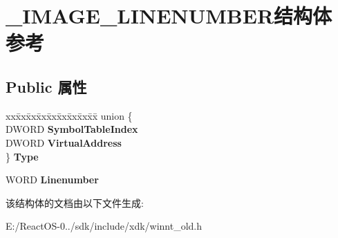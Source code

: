 \hypertarget{struct___i_m_a_g_e___l_i_n_e_n_u_m_b_e_r}{}\section{\+\_\+\+I\+M\+A\+G\+E\+\_\+\+L\+I\+N\+E\+N\+U\+M\+B\+E\+R结构体 参考}
\label{struct___i_m_a_g_e___l_i_n_e_n_u_m_b_e_r}
\subsection*{Public 属性}
\begin{DoxyCompactItemize}
\item 
\mbox{\label{struct___i_m_a_g_e___l_i_n_e_n_u_m_b_e_r_afc6fd323149b3a872062c8051fcd2bc3}} 
\begin{tabbing}
xx\=xx\=xx\=xx\=xx\=xx\=xx\=xx\=xx\=\kill
union \{\\
\>DWORD {\bfseries SymbolTableIndex}\\
\>DWORD {\bfseries VirtualAddress}\\
\} {\bfseries Type}\\

\end{tabbing}\item 
\mbox{\label{struct___i_m_a_g_e___l_i_n_e_n_u_m_b_e_r_a410ec88dcf79512bf61a042d19e39f7d}} 
W\+O\+RD {\bfseries Linenumber}
\end{DoxyCompactItemize}


该结构体的文档由以下文件生成\+:\begin{DoxyCompactItemize}
\item 
E\+:/\+React\+O\+S-\/0../sdk/include/xdk/winnt\+\_\+old.\+h\end{DoxyCompactItemize}
